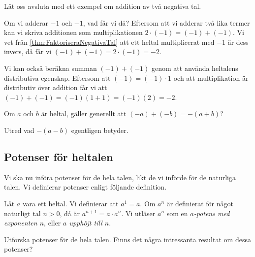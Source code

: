 Låt oss avsluta med ett exempel om addition av två negativa tal.
\begin{example}
  Om vi adderar \(-1\) och \(-1\), vad får vi då?
  Eftersom att vi adderar två lika termer kan vi skriva additionen som
  multiplikationen \(2\cdot (-1) = (-1)+(-1)\).
  Vi vet från \cref{thm:FaktoriseraNegativaTal} att ett heltal
  multiplicerat med \(-1\) är dess invers, då får vi \((-1)+(-1)=2\cdot
  (-1) = -2\).
\end{example}
\begin{example}
  Vi kan också beräkna summan \((-1)+(-1)\) genom att använda heltalens
  distributiva egenskap.
  Eftersom att \((-1)=(-1)\cdot 1\) och att multiplikation är distributiv
  över addition får vi att \((-1)+(-1) = (-1)(1+1) = (-1)(2) = -2\).
\end{example}
\begin{exercise}
  Om \(a\) och \(b\) är heltal,
  gäller generellt att \((-a)+(-b)=-(a+b)\)?
\end{exercise}

\begin{exercise}
  Utred vad \(-(a-b)\) egentligen betyder.
\end{exercise}


\subsection{Potenser för heltalen}
Vi ska nu införa potenser för de hela talen, likt de vi införde för de
naturliga talen.
Vi definierar potenser enligt följande definition.
\begin{definition}
  Låt \(a\) vara ett heltal.
  Vi definierar att \(a^1=a\).
  Om \(a^{n}\) är definierat för något naturligt tal \(n > 0\), då är
  \(a^{n+1} = a\cdot a^n\).
  Vi utläser \(a^n\) som en \emph{\(a\)-potens med exponenten \(n\)}, eller 
  \emph{\(a\) upphöjt till \(n\)}.
\end{definition}

\begin{exercise}
  Utforska potenser för de hela talen.
  Finns det några intressanta resultat om dessa potenser?
\end{exercise}

